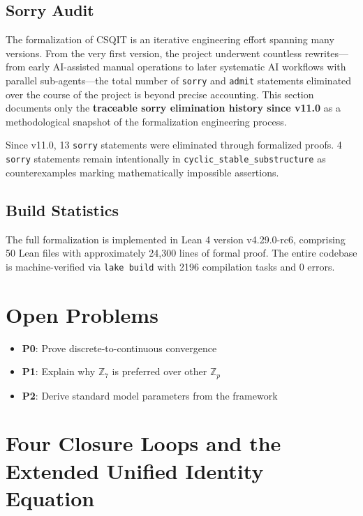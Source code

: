 \documentclass[aps,prd,twocolumn,nofootinbib,floatfix]{revtex4-2}
\begin{document}
\subsection{Sorry Audit}

The formalization of CSQIT is an iterative engineering effort spanning many versions. From the very first version, the project underwent countless rewrites---from early AI-assisted manual operations to later systematic AI workflows with parallel sub-agents---the total number of \texttt{sorry} and \texttt{admit} statements eliminated over the course of the project is beyond precise accounting. This section documents only the \textbf{traceable sorry elimination history since v11.0} as a methodological snapshot of the formalization engineering process.

Since v11.0, 13 \texttt{sorry} statements were eliminated through formalized proofs. 4 \texttt{sorry} statements remain intentionally in \texttt{cyclic\_stable\_substructure} as counterexamples marking mathematically impossible assertions.

\subsection{Build Statistics}

The full formalization is implemented in Lean 4 version v4.29.0-rc6, comprising 50 Lean files with approximately 24,300 lines of formal proof. The entire codebase is machine-verified via \texttt{lake build} with 2196 compilation tasks and 0 errors.

\section{Open Problems}

\begin{itemize}
    \item \textbf{P0}: Prove discrete-to-continuous convergence
    \item \textbf{P1}: Explain why $\mathbb{Z}_7$ is preferred over other $\mathbb{Z}_p$
    \item \textbf{P2}: Derive standard model parameters from the framework
\end{itemize}

\section{Four Closure Loops and the Extended Unified Identity Equation}
\end{document}
